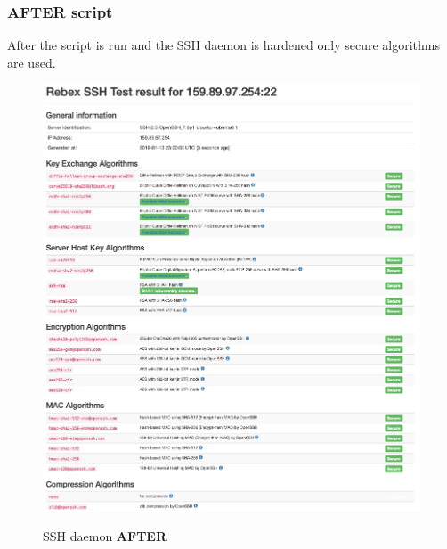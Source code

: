 \subsubsection{AFTER script}
After the script is run and the SSH daemon is hardened only secure algorithms are used.
\begin{figure}[H]
        \centering
        \includegraphics[width=1.0\linewidth]{pics/score_SSH}
        \label{fig:scoressh}
                \caption{SSH daemon \textbf{AFTER}}
\end{figure}
\newpage
